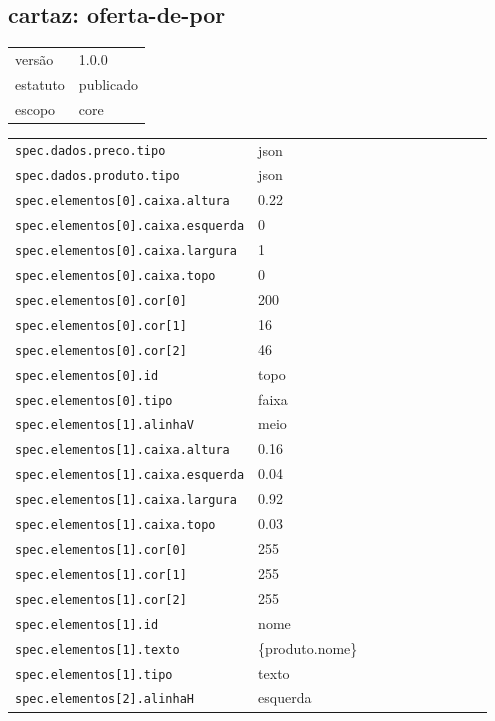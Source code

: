 \subsection*{cartaz: oferta-de-por}
\begin{tabular}{@{}ll@{}}
versão & 1.0.0 \\
estatuto & publicado \\
escopo & core \\
\end{tabular}

\begin{tabular}{@{}p{0.35\linewidth}p{0.6\linewidth}@{}}
\texttt{spec.dados.preco.tipo} & json \\
\texttt{spec.dados.produto.tipo} & json \\
\texttt{spec.elementos[0].caixa.altura} & 0.22 \\
\texttt{spec.elementos[0].caixa.esquerda} & 0 \\
\texttt{spec.elementos[0].caixa.largura} & 1 \\
\texttt{spec.elementos[0].caixa.topo} & 0 \\
\texttt{spec.elementos[0].cor[0]} & 200 \\
\texttt{spec.elementos[0].cor[1]} & 16 \\
\texttt{spec.elementos[0].cor[2]} & 46 \\
\texttt{spec.elementos[0].id} & topo \\
\texttt{spec.elementos[0].tipo} & faixa \\
\texttt{spec.elementos[1].alinhaV} & meio \\
\texttt{spec.elementos[1].caixa.altura} & 0.16 \\
\texttt{spec.elementos[1].caixa.esquerda} & 0.04 \\
\texttt{spec.elementos[1].caixa.largura} & 0.92 \\
\texttt{spec.elementos[1].caixa.topo} & 0.03 \\
\texttt{spec.elementos[1].cor[0]} & 255 \\
\texttt{spec.elementos[1].cor[1]} & 255 \\
\texttt{spec.elementos[1].cor[2]} & 255 \\
\texttt{spec.elementos[1].id} & nome \\
\texttt{spec.elementos[1].texto} & \{produto.nome\} \\
\texttt{spec.elementos[1].tipo} & texto \\
\texttt{spec.elementos[2].alinhaH} & esquerda \\

\end{tabular}
